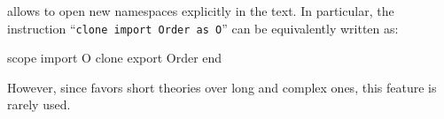 \why allows to open new namespaces explicitly in the text. In particular,
the instruction ``\texttt{clone import Order as O}'' can be equivalently
written as:
\begin{whycode}
scope import O
  clone export Order
end
\end{whycode}
However, since \why favors short theories over long and complex ones,
this feature is rarely used.



